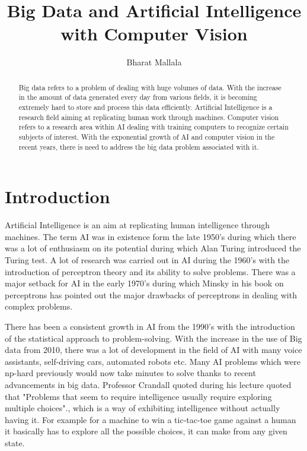 \documentclass[sigconf]{acmart}
\begin{document}
\title{Big Data and Artificial Intelligence with Computer Vision}

\author{Bharat Mallala}








\begin{abstract}
Big data refers to a problem of dealing with huge volumes of data. With the increase in the amount of data generated every day from various fields, it is becoming extremely hard to store and process this data efficiently. Artificial Intelligence is a research field aiming at replicating human work through machines. Computer vision refers to a research area within AI dealing with training computers to recognize certain subjects of interest. With the exponential growth of AI and computer vision in the recent years, there is need to address the big data problem associated with it.
\end{abstract}



\maketitle

\section{Introduction}
Artificial Intelligence is an aim at replicating human intelligence through machines. The term AI was in existence form the late 1950's during which there was a lot of enthusiasm on its potential during which Alan Turing introduced the Turing test. A lot of research was carried out in AI during the 1960's with the introduction of perceptron theory and its ability to solve problems. There was a major setback for AI in the early 1970's during which Minsky in his book on perceptrons has pointed out the major drawbacks of perceptrons in dealing with complex problems.\cite{Crandall}

There has been a consistent growth in AI from the 1990's with the introduction of the statistical approach to problem-solving. With the increase in the use of Big data from 2010, there was a lot of development in the field of AI with many voice assistants, self-driving cars, automated robots etc. Many AI problems which were np-hard previously would now take minutes to solve thanks to recent advancements in big data. Professor Crandall quoted during his lecture quoted that "Problems that seem to require intelligence usually require exploring multiple choices".\cite{Crandall}, which is a way of exhibiting intelligence without actually having it. For example for a machine to win a tic-tac-toe game against a human it basically has to explore all the possible choices, it can make from any given state.
\end{document}
